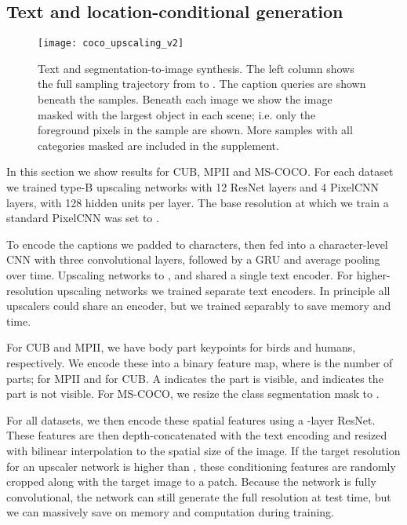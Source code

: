 \documentclass{article}
\begin{document}
\subsection{Text and location-conditional generation}


\begin{figure*}[h!]
\centering
\texttt{[image: coco\_upscaling\_v2]}
\vspace{-0.25in}
\caption{Text and segmentation-to-image synthesis. The left column shows the full sampling trajectory from  to . The caption queries are shown beneath the samples. Beneath each image we show the image masked with the largest object in each scene; i.e. only the foreground pixels in the sample are shown. More samples with all categories masked are included in the supplement.\label{fig:coco}}
\end{figure*}

In this section we show results for CUB, MPII and MS-COCO.
For each dataset we trained type-B upscaling networks with 12 ResNet layers and 4 PixelCNN layers, with 128 hidden units per layer.
The base resolution at which we train a standard PixelCNN was set to .

To encode the captions we padded to  characters, then fed into a character-level CNN with three convolutional layers, followed by a GRU and average pooling over time.
Upscaling networks to ,  and  shared a single text encoder.
For higher-resolution upscaling networks we trained separate text encoders.
In principle all upscalers could share an encoder, but we trained separably to save memory and time.

For CUB and MPII, we have body part keypoints for birds and humans, respectively.
We encode these into a  binary feature map, where  is the number of parts;  for MPII and  for CUB.
A  indicates the part is visible, and  indicates the part is not visible.
For MS-COCO, we resize the class segmentation mask to .


For all datasets, we then encode these spatial features using a -layer ResNet.
These features are then depth-concatenated with the text encoding and resized with bilinear interpolation to the spatial size of the image.
If the target resolution for an upscaler network is higher than , these conditioning features are randomly cropped along with the target image to a  patch.
Because the network is fully convolutional, the network can still generate the full resolution at test time, but we can massively save on memory and computation during training.
\end{document}
